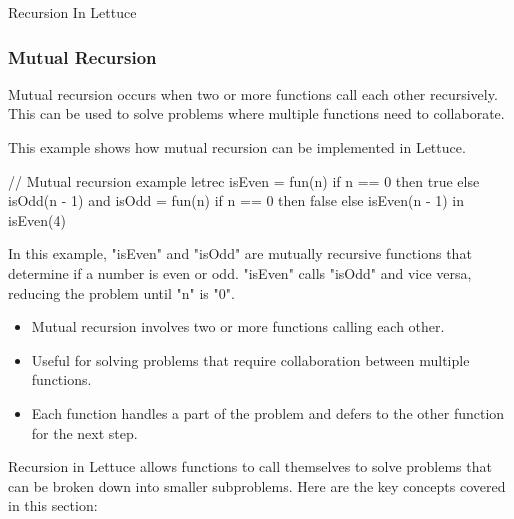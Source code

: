 \begin{notes}{Recursion In Lettuce}
\begin{highlight}
    \end{highlight}
    
    \subsubsection*{Mutual Recursion}
    
    Mutual recursion occurs when two or more functions call each other recursively. This can be used to solve problems where multiple functions need to collaborate.
    
    \begin{highlight}
    
        This example shows how mutual recursion can be implemented in Lettuce.
    
    \begin{code}[Lettuce]
    // Mutual recursion example
    letrec isEven = fun(n) {
        if n == 0 then true else isOdd(n - 1)
    } and isOdd = fun(n) {
        if n == 0 then false else isEven(n - 1)
    } in
    isEven(4)
    \end{code}
    
        In this example, "isEven" and "isOdd" are mutually recursive functions that determine if a number is even or odd. "isEven" calls "isOdd" and vice versa, reducing the problem until "n" is "0".
    
        \begin{itemize}
            \item Mutual recursion involves two or more functions calling each other.
            \item Useful for solving problems that require collaboration between multiple functions.
            \item Each function handles a part of the problem and defers to the other function for the next step.
        \end{itemize}
    
    \end{highlight}
    
    \begin{highlight}
    
        Recursion in Lettuce allows functions to call themselves to solve problems that can be broken down into smaller subproblems. Here are the key concepts covered in this section:
    

\end{highlight}
\end{notes}
